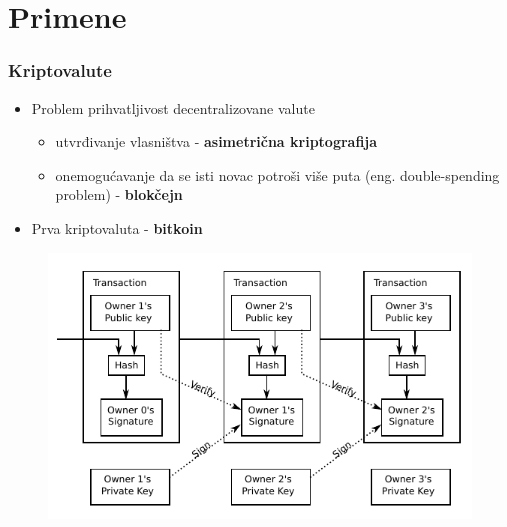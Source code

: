 \documentclass{beamer}
\begin{document}
\section{Primene}

\begin{frame}[fragile]\frametitle{Kriptovalute}
	\begin{itemize}
		\item Problem prihvatljivost decentralizovane valute
		\begin{itemize}
			\item utvrđivanje vlasništva - \textbf{asimetrična kriptografija}
			\item onemogućavanje da se isti novac potroši više puta (eng. double-spending problem) - \textbf{blokčejn}
		\end{itemize}
		\item Prva kriptovaluta - \textbf{bitkoin}
	\end{itemize}
	\begin{figure}[H]
		\includegraphics[scale=0.5]{Bitcoin_Transaction_Visual.pdf}
	\end{figure}
\end{frame}
\end{document}
